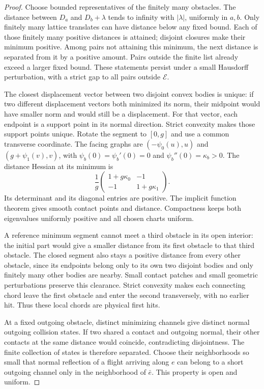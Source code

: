 \begin{proof}
Choose bounded representatives of the finitely many obstacles. The
distance between $D_a$ and $D_b+\lambda$ tends to infinity with
$|\lambda|$, uniformly in $a,b$. Only finitely many lattice translates
can have distance below any fixed bound. Each of those finitely many
positive distances is attained; disjoint closures make their minimum
positive. Among pairs not attaining this minimum, the next distance is
separated from it by a positive amount. Pairs outside the finite list
already exceed a larger fixed bound. These statements persist under a
small Hausdorff perturbation, with a strict gap to all pairs outside
$\mathcal E$.

The closest displacement vector between two disjoint convex bodies is
unique: if two different displacement vectors both minimized its norm,
their midpoint would have smaller norm and would still be a displacement.
For that vector, each endpoint is a support point in its normal direction.
Strict convexity makes those support points unique. Rotate the segment
to $[0,g]$ and use a common transverse coordinate. The facing graphs are
$(-\psi_0(u),u)$ and $(g+\psi_1(v),v)$, with
$\psi_b(0)=\psi_b'(0)=0$ and $\psi_b''(0)=\kappa_b>0$.
The distance Hessian at its minimum is
\begin{equation}\label{eq:g-single-hessian}
 \frac1g\begin{pmatrix}1+g\kappa_0&-1\\-1&1+g\kappa_1\end{pmatrix}.
\end{equation}
Its determinant and its diagonal entries are positive. The implicit
function theorem gives smooth contact points and distance. Compactness
keeps both eigenvalues uniformly positive and all chosen charts uniform.

A reference minimum segment cannot meet a third obstacle in its open
interior: the initial part would give a smaller distance from its first
obstacle to that third obstacle. The closed segment also stays a positive
distance from every other obstacle, since its endpoints belong only to
its own two disjoint bodies and only finitely many other bodies are
nearby. Small contact patches and small geometric perturbations preserve
this clearance. Strict convexity makes each connecting chord leave the
first obstacle and enter the second transversely, with no earlier hit.
Thus these local chords are physical first hits.

At a fixed outgoing obstacle, distinct minimizing channels give distinct
normal outgoing collision states. If two shared a contact and outgoing
normal, their other contacts at the same distance would coincide,
contradicting disjointness. The finite collection of states is therefore
separated. Choose their neighborhoods so small that normal reflection
of a flight arriving along $e$ can belong to a short outgoing channel
only in the neighborhood of $\bar e$. This property is open and uniform.


\end{proof}
